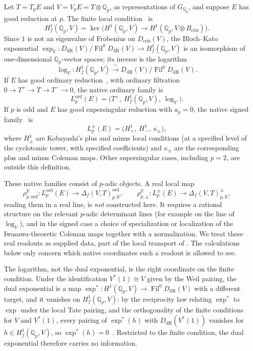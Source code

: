 \documentclass[11pt]{article}
\theoremstyle{definition}
\newcommand{\R}{\mathbb{R}}
\newcommand{\Qp}{\mathbb{Q}_p}
\newcommand{\Hf}{H^1_f}
\begin{document}
\begin{definition}\label{def:apparatus:p-adic-map}
Let $T=T_pE$ and $V=V_pE=T\otimes\Qp$, as representations of $G_{\Qp}$,
and suppose $E$ has good reduction at $p$.  The finite local
condition~\citep{BlochKato1990,Fontaine1994} is
\[
  \Hf(\Qp,V)
  =
  \ker\bigl(H^1(\Qp,V)\to H^1(\Qp,V\otimes B_{\mathrm{cris}})\bigr).
\]
Since $1$ is not an eigenvalue of Frobenius on $D_{\mathrm{cris}}(V)$, the
Bloch--Kato exponential
$\exp_V:D_{\mathrm{dR}}(V)/\operatorname{Fil}^0D_{\mathrm{dR}}(V)\to\Hf(\Qp,V)$
is an isomorphism of one-dimensional $\Qp$-vector spaces; its inverse is
the logarithm
\[
  \log_V:\Hf(\Qp,V)\xrightarrow{\ \sim\ }
  D_{\mathrm{dR}}(V)/\operatorname{Fil}^0D_{\mathrm{dR}}(V).
\]
If $E$ has good ordinary reduction~\citep{Mazur1972}, with ordinary
filtration $0\to T^+\to T\to T^-\to0$, the native ordinary family is
\[
  L_p^{\mathrm{ord}}(E)=\bigl(T^+,\ \Hf(\Qp,V),\ \log_V\bigr).
\]
If $p$ is odd and $E$ has good supersingular reduction with $a_p=0$, the
native signed family~\citep{Kobayashi2003,Pollack2003} is
\[
  L_p^{\pm}(E)=\bigl(H^1_+,\ H^1_-,\ \kappa_\pm\bigr),
\]
where $H^1_\pm$ are Kobayashi's plus and minus local conditions (at a
specified level of the cyclotomic tower, with specified coefficients) and
$\kappa_\pm$ are the corresponding plus and minus Coleman maps.  Other
supersingular cases, including $p=2$, are outside this definition.

These native families consist of $p$-adic objects.  A real local map
\[
  \rho_{p,\mathrm{ord}}^{\R}:L_p^{\mathrm{ord}}(E)\longrightarrow
  \Delta_f(V,T)_{p,\R}^{\mathrm{ord}},
  \qquad
  \rho_{p,\pm}^{\R}:L_p^{\pm}(E)\longrightarrow
  \Delta_f(V,T)_{p,\R}^{\pm},
\]
reading them in a real line, is \emph{not} constructed here.  It requires
a rational structure on the relevant $p$-adic determinant lines (for
example on the line of $\log_V$), and in the signed case a choice of
specialization or localization of the Iwasawa-theoretic Coleman maps
together with a normalization.  We treat these real readouts as supplied
data, part of the local transport of .
The calculations below only concern which native coordinates such a
readout is allowed to see.
\end{definition}

The logarithm, not the dual exponential, is the right coordinate on the
finite condition.  Under the identification $V^*(1)\cong V$ given by the
Weil pairing, the dual exponential is a map
$\exp^*:H^1(\Qp,V)\to\operatorname{Fil}^0D_{\mathrm{dR}}(V)$ with a
different target, and it vanishes on $\Hf(\Qp,V)$: by the reciprocity law
relating $\exp^*$ to $\exp$ under the local Tate pairing, and the
orthogonality of the finite conditions for $V$ and $V^*(1)$, every
pairing of $\exp^*(h)$ with $D_{\mathrm{dR}}(V^*(1))$ vanishes for
$h\in\Hf(\Qp,V)$, so $\exp^*(h)=0$~\citep{BlochKato1990,Kato2004}.
Restricted to the finite condition, the dual exponential therefore
carries no information.
\end{document}
